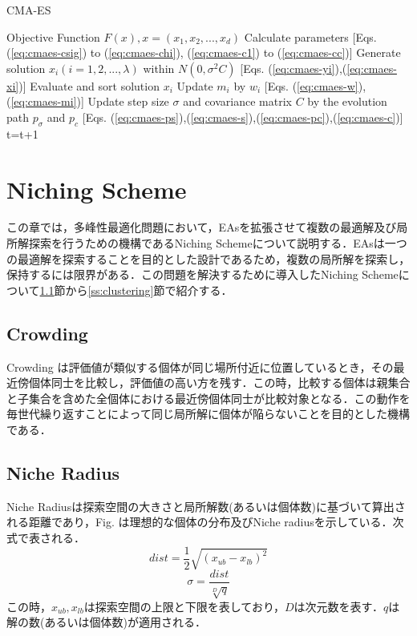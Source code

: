 \documentclass[a4j,11pt]{jarticle}
\begin{document}
\begin{algorithm}[H]
\caption{CMA-ES}
\label{code:cma-es}
\begin{algorithmic}[5]
\REQUIRE Objective Function $F(x), x=(x_1,x_2,...,x_d)$
\STATE Calculate parameters [Eqs. (\ref{eq:cmaes-csig}) to (\ref{eq:cmaes-chi}), (\ref{eq:cmaes-c1}) to (\ref{eq:cmaes-cc})]
\STATE Generate solution $x_i (i=1,2,...,\lambda)$ within $N(0, \sigma^2 C)$ [Eqs. (\ref{eq:cmaes-yi}),(\ref{eq:cmaes-xi})]
\ENDFOR
\STATE Evaluate and sort solution $x_i$
\STATE Update $m_i$ by $w_i$ [Eqs. (\ref{eq:cmaes-w}),(\ref{eq:cmaes-mi})]
\STATE Update step size $\sigma$ and covariance matrix $C$ by the evolution path $p_{\sigma}$ and $p_c$ [Eqs. (\ref{eq:cmaes-ps}),(\ref{eq:cmaes-s}),(\ref{eq:cmaes-pc}),(\ref{eq:cmaes-c})]
\ENDFOR
\STATE t=t+1
\ENDWHILE
\end{algorithmic}
\end{algorithm}

\newpage
\section{Niching Scheme}
\label{sec:ns}
この章では，多峰性最適化問題において，EAsを拡張させて複数の最適解及び局所解探索を行うための機構であるNiching Schemeについて説明する．EAsは一つの最適解を探索することを目的とした設計であるため，複数の局所解を探索し，保持するには限界がある．この問題を解決するために導入したNiching Schemeについて\ref{ss:Crowding}節から\ref{ss:clustering}節で紹介する．

\subsection{Crowding}
\label{ss:Crowding}
Crowding \cite{Crowding} は評価値が類似する個体が同じ場所付近に位置しているとき，その最近傍個体同士を比較し，評価値の高い方を残す．この時，比較する個体は親集合と子集合を含めた全個体における最近傍個体同士が比較対象となる．この動作を毎世代繰り返すことによって同じ局所解に個体が陥らないことを目的とした機構である．

\subsection{Niche Radius}
\label{ss:nr}
Niche Radiusは探索空間の大きさと局所解数(あるいは個体数)に基づいて算出される距離であり，Fig. は理想的な個体の分布及びNiche radiusを示している．次式で表される．
\begin{equation}
\label{eq:nr-d}
dist=\frac{1}{2}\sqrt{(x_{ub}-x_{lb})^2}
\end{equation}
\begin{equation}
\label{eq:nr-s}
\sigma=\frac{dist}{\sqrt[D]{q}}
\end{equation}
この時，$x_{ub},x_{lb}$は探索空間の上限と下限を表しており，$D$は次元数を表す．$q$は解の数(あるいは個体数)が適用される．
\end{document}
